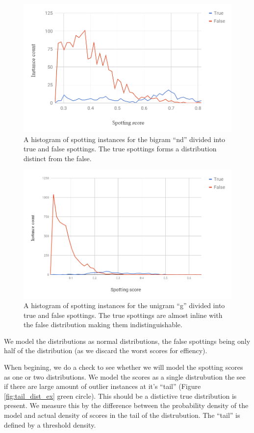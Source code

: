 \documentclass[ms,electronic,twosidetoc,letterpaper,chaptercenter,parttop,lof,lot]{byumsphd}
\begin{document}
\begin{figure}
    \centering
    \includegraphics[width=.75\textwidth]{two_dist_ex}
    \caption{A histogram of spotting instances for the bigram ``nd'' divided into true and false spottings. The true spottings forms a distribution distinct from the false.
    }
    \label{fig:two_dist_ex}
\end{figure}
\begin{figure}
    \centering
    \includegraphics[width=.75\textwidth]{one_dist_ex}
    \caption{A histogram of spotting instances for the unigram ``g'' divided into true and false spottings. The true spottings are almost inline with the false distribution making them indistinguishable.
    }
    \label{fig:one_dist_ex}
\end{figure}

We model the distributions as normal distributions, the false spottings being only half of the distribution (as we discard the worst scores for effiency).

When begining, we do a check to see whether we will model the spotting scores as one or two distributions. We model the scores as a single distrubution the see if there are large amount of outlier instances at it's ``tail'' (Figure \ref{fig:tail_dist_ex} green circle). This should be a distictive true distribution is present. We measure this by the difference between the probability density of the model and actual density of scores in the tail of the distrubution. The ``tail'' is defined by a threshold density.
\end{document}
